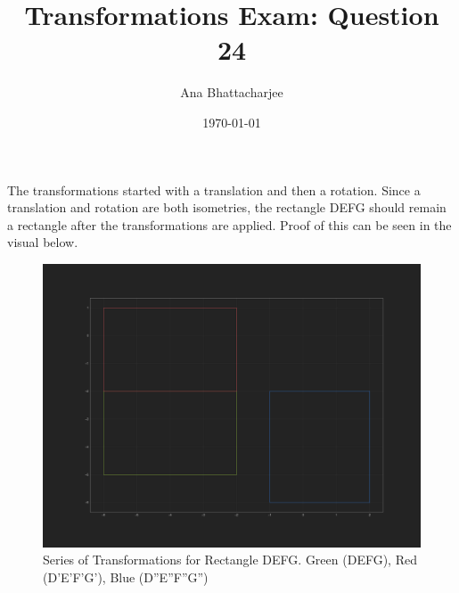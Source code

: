 \documentclass{article}
\begin{document}
\title{Transformations Exam: Question 24}
\author{Ana Bhattacharjee}
\date{\today}
\maketitle{}

\begin{center}
  The transformations started with a translation and then a rotation. Since a translation and rotation are both isometries, the rectangle DEFG should remain a rectangle after the transformations are applied. Proof of this can be seen in the visual below.
  \begin{figure}[!htbp]
    \includegraphics[width=1.0\columnwidth]{exam.png}
    \caption{Series of Transformations for Rectangle DEFG. Green (DEFG), Red (D'E'F'G'), Blue (D''E''F''G'')}
  \end{figure}
\end{center}
\end{document}

